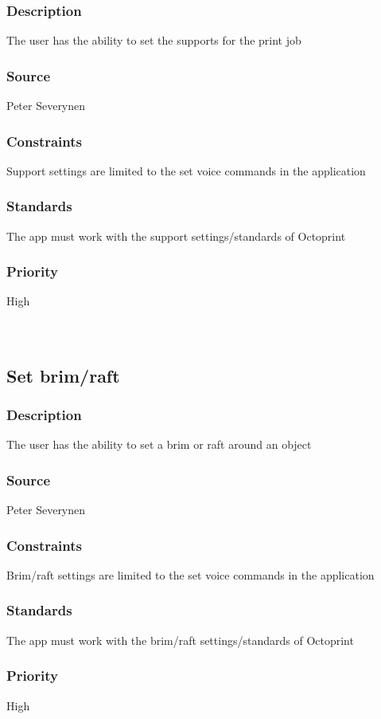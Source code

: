 \subsubsection{Description}
The user has the ability to set the supports for the print job
\subsubsection{Source}
Peter Severynen
\subsubsection{Constraints}
Support settings are limited to the set voice commands in the application
\subsubsection{Standards}
The app must work with the support settings/standards of Octoprint
\subsubsection{Priority}
High\\
\\
\\
\subsection{Set brim/raft}
\subsubsection{Description}
The user has the ability to set a brim or raft around an object
\subsubsection{Source}
Peter Severynen
\subsubsection{Constraints}
Brim/raft settings are limited to the set voice commands in the application
\subsubsection{Standards}
The app must work with the brim/raft settings/standards of Octoprint
\subsubsection{Priority}
High\\
\\
\\
